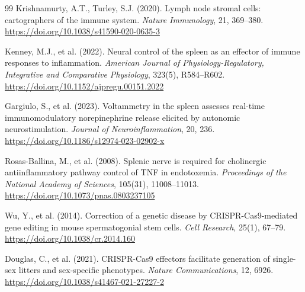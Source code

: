 \documentclass[12pt]{article}
\begin{document}
\begin{thebibliography}{99}
Krishnamurty, A.T., Turley, S.J. (2020).
Lymph node stromal cells: cartographers of the immune system.
\textit{Nature Immunology}, 21, 369--380.
\url{https://doi.org/10.1038/s41590-020-0635-3}

Kenney, M.J., et al. (2022).
Neural control of the spleen as an effector of immune responses to inflammation.
\textit{American Journal of Physiology-Regulatory, Integrative and Comparative Physiology}, 323(5), R584--R602.
\url{https://doi.org/10.1152/ajpregu.00151.2022}

Gargiulo, S., et al. (2023).
Voltammetry in the spleen assesses real-time immunomodulatory norepinephrine release elicited by autonomic neurostimulation.
\textit{Journal of Neuroinflammation}, 20, 236.
\url{https://doi.org/10.1186/s12974-023-02902-x}

Rosas-Ballina, M., et al. (2008).
Splenic nerve is required for cholinergic antiinflammatory pathway control of TNF in endotoxemia.
\textit{Proceedings of the National Academy of Sciences}, 105(31), 11008--11013.
\url{https://doi.org/10.1073/pnas.0803237105}

Wu, Y., et al. (2014).
Correction of a genetic disease by CRISPR-Cas9-mediated gene editing in mouse spermatogonial stem cells.
\textit{Cell Research}, 25(1), 67--79.
\url{https://doi.org/10.1038/cr.2014.160}

Douglas, C., et al. (2021).
CRISPR-Cas9 effectors facilitate generation of single-sex litters and sex-specific phenotypes.
\textit{Nature Communications}, 12, 6926.
\url{https://doi.org/10.1038/s41467-021-27227-2}

\end{thebibliography}
\end{document}
